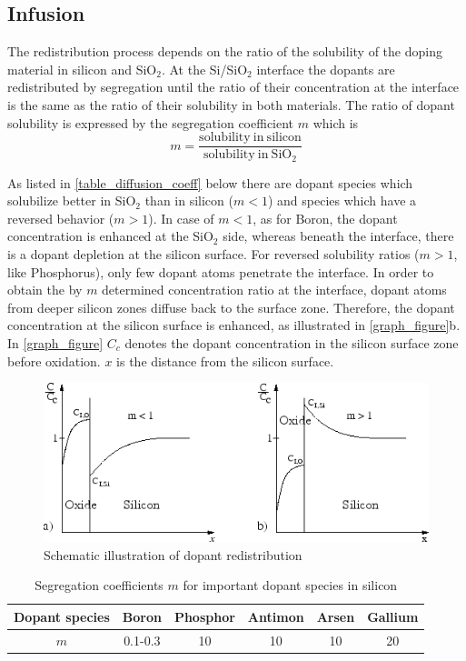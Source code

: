 \subsection{Infusion}
The redistribution process depends on the ratio of the solubility of the doping material in silicon and SiO$ _2$. At the Si/SiO$ _2$ interface the dopants are redistributed by segregation until the ratio of their concentration at the interface is the same as the ratio of their solubility in both materials. The ratio of dopant solubility is expressed by the segregation coefficient $m$ which is
\begin{equation}
\displaystyle m = \frac{
	\mathrm{solubility\ in\ silicon}
	}{
	\mathrm{solubility\ in\ SiO_2}
	}
\end{equation}

As listed in \autoref{table_diffusion_coeff} below there are dopant species which solubilize better in SiO$ _2$ than in silicon ($ m < 1$) and species which have a reversed behavior ($ m > 1$).
In case of $ m < 1$, as for Boron, the dopant concentration is enhanced at the SiO$ _2$ side, whereas beneath the interface, there is a dopant depletion at the silicon surface.
For reversed solubility ratios ($ m > 1$, like Phosphorus), only few dopant atoms penetrate the interface.
In order to obtain the by $ m$ determined concentration ratio at the interface, dopant atoms from deeper silicon zones diffuse back to the surface zone.
Therefore, the dopant concentration at the silicon surface is enhanced, as illustrated in \autoref{graph_figure}b.
In \autoref{graph_figure} $ C_c$ denotes the dopant concentration in the silicon surface zone before oxidation. $ x$ is the distance from the silicon surface.
\begin{center}
	\begin{figure}[h]
		\begin{center}
			\includegraphics[width=0.75\linewidth]{img349.png}
		\end{center}
		\caption{Schematic illustration of dopant redistribution}
		\label{graph_figure}
	\end{figure}
	\begin{table}[h]
		\begin{tabular}{|c|c|c|c|c|c|}
			\hline
			Dopant species &
			Boron &
			Phosphor &
			Antimon &
			Arsen &
			Gallium \\
			\hline
			$m$ &
			0.1-0.3 &
			10 &
			10 &
			10 &
			20 \\
			\hline
		\end{tabular}
		\caption{Segregation coefficients $m$ for important dopant species in silicon}
		\label{table_diffusion_coeff}
	\end{table}
\end{center}
